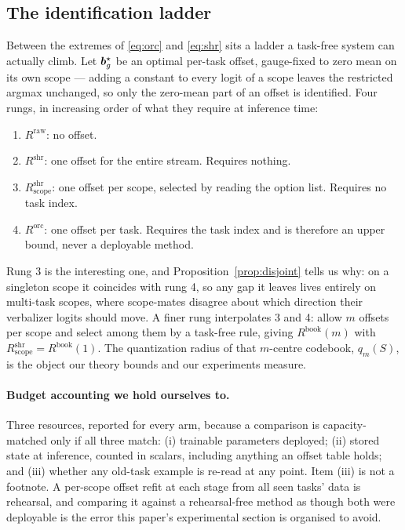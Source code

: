 \subsection{The identification ladder}
\label{sec:ladder}

Between the extremes of \eqref{eq:orc} and \eqref{eq:shr} sits a ladder a
task-free system can actually climb. Let $\bm{b}_g^\star$ be an optimal per-task
offset, gauge-fixed to zero mean on its own scope --- adding a constant to every
logit of a scope leaves the restricted argmax unchanged, so only the zero-mean
part of an offset is identified. Four rungs, in increasing order of what they
require at inference time:
\begin{enumerate}
  \item $R^{\mathrm{raw}}$: no offset.
  \item $R^{\mathrm{shr}}$: one offset for the entire stream. Requires nothing.
  \item $R^{\mathrm{shr}}_{\mathrm{scope}}$: one offset per scope, selected by
        reading the option list. Requires no task index.
  \item $R^{\mathrm{orc}}$: one offset per task. Requires the task index and is
        therefore an upper bound, never a deployable method.
\end{enumerate}
Rung 3 is the interesting one, and Proposition~\ref{prop:disjoint} tells us why:
on a singleton scope it coincides with rung 4, so any gap it leaves lives
entirely on multi-task scopes, where scope-mates disagree about which direction
their verbalizer logits should move. A finer rung interpolates 3 and 4: allow
$m$ offsets per scope and select among them by a task-free rule, giving
$R^{\mathrm{book}}(m)$ with $R^{\mathrm{shr}}_{\mathrm{scope}}=R^{\mathrm{book}}(1)$.
The quantization radius of that $m$-centre codebook, $q_m(S)$, is the object our
theory bounds and our experiments measure.

\paragraph{Budget accounting we hold ourselves to.}
Three resources, reported for every arm, because a comparison is capacity-matched
only if all three match: (i) trainable parameters deployed; (ii) stored state at
inference, counted in scalars, including anything an offset table holds; and
(iii) whether any old-task example is re-read at any point. Item (iii) is not a
footnote. A per-scope offset refit at each stage from all seen tasks' data is
rehearsal, and comparing it against a rehearsal-free method as though both were
deployable is the error this paper's experimental section is organised to avoid.
